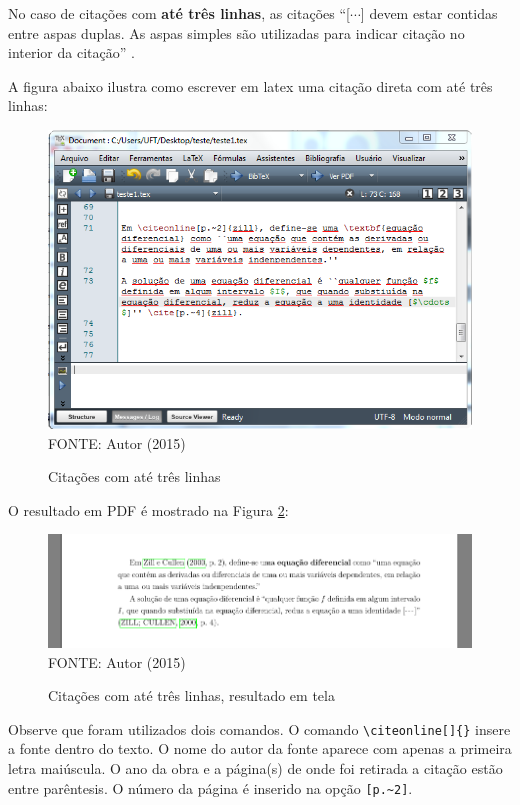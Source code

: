 No caso de citações com \textbf{até três linhas}, as citações ``[$\cdots$] devem estar contidas entre aspas duplas. As aspas simples são
utilizadas para indicar citação no interior da citação'' \cite[p.~2]{nbr10520}. 



A figura abaixo ilustra como escrever em latex uma citação direta com até três linhas:
	\begin{figure}[H]
	\centering
	\caption{Citações com até três linhas}
	\includegraphics[scale=0.45]
	{img/fig10.png}\label{fig10}\\
	FONTE: Autor (2015)
	\end{figure}

O resultado em PDF é mostrado na Figura \ref{fig11}:
	\begin{figure}[H]
	\centering
	\caption{Citações com até três linhas, resultado em tela}
	\includegraphics[scale=0.45]
	{img/fig11.png}\label{fig11}\\
	FONTE: Autor (2015)
	\end{figure}
	
	Observe que foram utilizados dois comandos. O comando \verb!\citeonline[]{}! insere a fonte dentro do texto. O nome do autor da fonte aparece com apenas a primeira letra maiúscula. O ano da obra e a página(s) de onde foi retirada a citação estão entre parêntesis. O número da página é inserido na opção \verb![p.~2]!.
	
